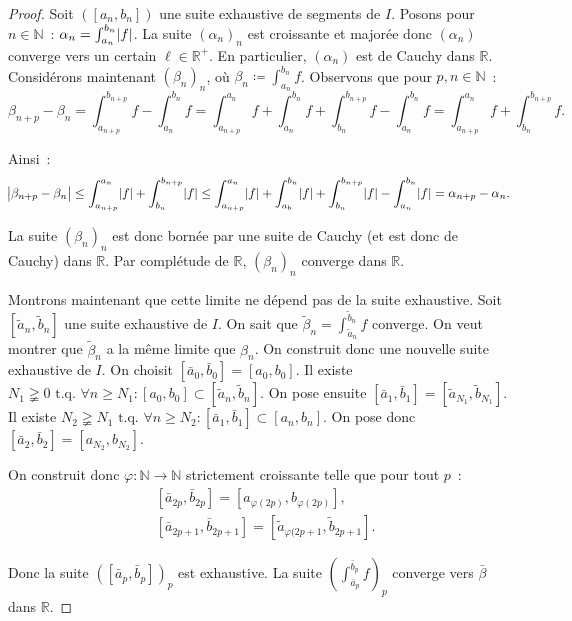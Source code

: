 \documentclass{report}
\theoremstyle{definition}
\theoremstyle{remark}
\newcommand{\R}{\mathbb R}
\newcommand{\Rp}{\R^{+}}
\newcommand{\N}{\mathbb N}
\newcommand{\tq}{\text{ t.q. }}
\begin{document}
			\begin{proof} Soit $([a_n, b_n])$ une suite exhaustive de segments de $I$. Posons pour $n \in \N$~: $\alpha_n = \int_{a_n}^{b_n}\abs f$.
			La suite $(\alpha_n)_n$ est croissante et majorée donc $(\alpha_n)$ converge vers un certain $\ell \in \Rp$. En particulier, $(\alpha_n)$ est de
			Cauchy dans $\R$. Considérons maintenant $(\beta_n)_n$, où $\beta_n \coloneqq \int_{a_n}^{b_n}f$. Observons que pour $p, n \in \N$~:
			\[\beta_{n+p} - \beta_n = \int_{a_{n+p}}^{b_{n+p}}f - \int_{a_n}^{b_n}f
				= \int_{a_{n+p}}^{a_n}f + \int_{a_n}^{b_n}f + \int_{b_n}^{b_{n+p}}f - \int_{a_n}^{b_n}f = \int_{a_{n+p}}^{a_n}f + \int_{b_n}^{b_{n+p}}f.\]

			Ainsi~:
			\[\abs {\beta_{n+p}-\beta_n} \leq \int_{a_{n+p}}^{a_n}\abs f + \int_{b_n}^{b_{n+p}} \abs f
				\leq \int_{a_{n+p}}^{a_n}\abs f + \int_{a_b}^{b_n} \abs f + \int_{b_n}^{b_{n+p}} \abs f - \int_{a_n}^{b_n}\abs f
				= \alpha_{n+p} - \alpha_n.\]

			La suite $(\beta_n)_n$ est donc bornée par une suite de Cauchy (et est donc de Cauchy) dans $\R$. Par complétude de $\R$, $(\beta_n)_n$ converge
			dans $\R$.

			Montrons maintenant que cette limite ne dépend pas de la suite exhaustive. Soit $[\widetilde a_n, \widetilde b_n]$ une suite exhaustive de $I$. On
			sait que $\widetilde \beta_n = \int_{\widetilde a_n}^{\widetilde b_n} f$ converge. On veut montrer que $\widetilde \beta_n$ a la même limite que
			$\beta_n$. On construit donc une nouvelle suite exhaustive de $I$. On choisit $[\bar a_0, \bar b_0] = [a_0, b_0]$. Il existe
			$N_1 \gneqq 0 \tq \forall n \geq N_1 : [a_0, b_0] \subset [\widetilde a_n, \widetilde b_n]$. On pose ensuite
			$[\bar a_1, \bar b_1] = [\widetilde a_{N_1}, \widetilde b_{N_1}]$. Il existe
			$N_2 \gneqq N_1 \tq \forall n \geq N_2 : [\bar a_1, \bar b_1] \subset [a_n, b_n]$. On pose donc $[\bar a_2, \bar b_2] = [a_{N_2}, b_{N_2}]$.

			On construit donc $\varphi : \N \to \N$ strictement croissante telle que pour tout $p$~:
			\begin{align*}
				&[\bar a_{2p}, \bar b_{2p}] = [a_{\varphi(2p)}, b_{\varphi(2p)}], \\
				&[\bar a_{2p+1}, \bar b_{2p+1}] = [\widetilde a_{\varphi(2p+1}, \widetilde b_{2p+1}].
			\end{align*}

			Donc la suite $([\bar a_p, \bar b_p])_p$ est exhaustive. La suite $\left(\int_{\bar a_p}^{\bar b_p}f\right)_p$ converge vers $\bar \beta$ dans $\R$.


\end{proof}
\end{document}
